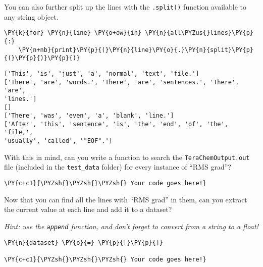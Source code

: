     You can also further split up the lines with the \texttt{.split()}
function available to any string object.

    \begin{tcolorbox}[breakable, size=fbox, boxrule=1pt, pad at break*=1mm,colback=cellbackground, colframe=cellborder]
\begin{Verbatim}[commandchars=\\\{\}]
\PY{k}{for} \PY{n}{line} \PY{o+ow}{in} \PY{n}{all\PYZus{}lines}\PY{p}{:}
    \PY{n+nb}{print}\PY{p}{(}\PY{n}{line}\PY{o}{.}\PY{n}{split}\PY{p}{(}\PY{p}{)}\PY{p}{)}
\end{Verbatim}
\end{tcolorbox}

    \begin{Verbatim}[commandchars=\\\{\}]
['This', 'is', 'just', 'a', 'normal', 'text', 'file.']
['There', 'are', 'words.', 'There', 'are', 'sentences.', 'There', 'are',
'lines.']
[]
['There', 'was', 'even', 'a', 'blank', 'line.']
['After', 'this', 'sentence', 'is', 'the', 'end', 'of', 'the', 'file,',
'usually', 'called', '"EOF".']
    \end{Verbatim}

    With this in mind, can you write a function to search the
\texttt{TeraChemOutput.out} file (included in the \texttt{test\_data}
folder) for every instance of ``RMS grad''?

    \begin{tcolorbox}[breakable, size=fbox, boxrule=1pt, pad at break*=1mm,colback=cellbackground, colframe=cellborder]
\begin{Verbatim}[commandchars=\\\{\}]
\PY{c+c1}{\PYZsh{}\PYZsh{}\PYZsh{} Your code goes here!}
\end{Verbatim}
\end{tcolorbox}

    Now that you can find all the lines with ``RMS grad'' in them, can you
extract the current value at each line and add it to a dataset?

\emph{Hint: use the \texttt{append} function, and don't forget to
convert from a string to a float!}

    \begin{tcolorbox}[breakable, size=fbox, boxrule=1pt, pad at break*=1mm,colback=cellbackground, colframe=cellborder]
\begin{Verbatim}[commandchars=\\\{\}]
\PY{n}{dataset} \PY{o}{=} \PY{p}{[}\PY{p}{]}

\PY{c+c1}{\PYZsh{}\PYZsh{}\PYZsh{} Your code goes here!}
\end{Verbatim}
\end{tcolorbox}

